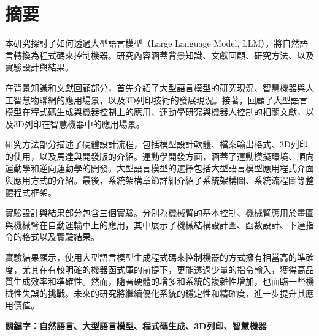 \documentclass[class=NCU_thesis, crop=false]{standalone}
\begin{document}
\chapter{摘要}

本研究探討了如何透過大型語言模型（Large Language Model, LLM），將自然語言轉換為程式碼來控制機器。研究內容涵蓋背景知識、文獻回顧、研究方法、以及實驗設計與結果。

在背景知識和文獻回顧部分，首先介紹了大型語言模型的研究現況、智慧機器與人工智慧物聯網的應用場景，以及3D列印技術的發展現況。接著，回顧了大型語言模型在程式碼生成與機器控制上的應用、運動學研究與機器人控制的相關文獻，以及3D列印在智慧機器中的應用場景。

研究方法部分描述了硬體設計流程，包括模型設計軟體、檔案輸出格式、3D列印的使用，以及馬達與開發版的介紹。運動學開發方面，涵蓋了運動模擬環境、順向運動學和逆向運動學的開發。大型語言模型的選擇包括大型語言模型應用程式介面與應用方式的介紹。最後，系統架構章節詳細介紹了系統架構圖、系統流程圖等整體程式框架。

實驗設計與結果部分包含三個實驗。分別為機械臂的基本控制、機械臂應用於畫圖與機械臂在自動運輸車上的應用，其中展示了機械結構設計圖、函數設計、下達指令的格式以及實驗結果。

實驗結果顯示，使用大型語言模型生成程式碼來控制機器的方式擁有相當高的準確度，尤其在有較明確的機器函式庫的前提下，更能透過少量的指令輸入，獲得高品質生成效率和準確性。然而，隨著硬體的增多和系統的複雜性增加，也面臨一些機械性失誤的挑戰。未來的研究將繼續優化系統的穩定性和精確度，進一步提升其應用價值。

\vspace{2em}
\noindent \textbf{關鍵字：自然語言、大型語言模型、程式碼生成、3D列印、智慧機器} \keywordsZh{} %
\end{document}

